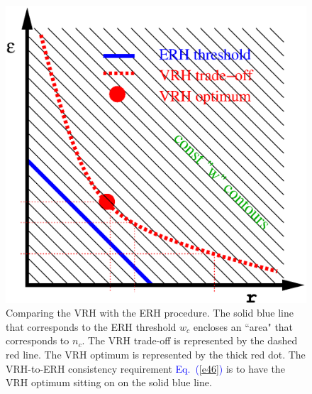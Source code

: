 \documentclass[aps,pre,floats,floatfix,twocolumn]{revtex4}
\newcommand{\Eq}[1]{\textcolor{blue}{Eq.\!\!~(\ref{#1})}}
\begin{document}
\twocolumngrid

\begin{figure}[h!]
\includegraphics[width=\hsize]{wdiagrm}

\caption{Comparing the VRH with the ERH procedure. 
The solid blue line that corresponds to the ERH threshold $w_c$ 
encloses an ``area" that corresponds to $n_c$. 
The VRH trade-off is represented by the dashed red line. 
The VRH optimum is represented by the thick red dot.
The VRH-to-ERH consistency requirement \Eq{e46} 
is to have the VRH optimum sitting on on the solid blue line.}
\label{fv}
\end{figure}
\end{document}
